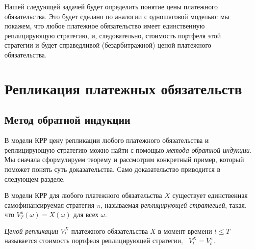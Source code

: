 Нашей следующей задачей будет определить понятие цены платежного обязательства.
Это будет сделано по аналогии с одношаговой моделью: мы покажем, что любое платежное обязательство имеет единственную реплицирующую стратегию, и, следовательно, стоимость портфеля этой стратегии и будет справедливой (безарбитражной) ценой платежного обязательства.


\section{Репликация платежных обязательств}
\subsection{Метод обратной индукции}

В модели КРР цену репликации любого платежного обязательства и реплицирующую стратегию можно найти с помощью \emph{метода обратной индукции}.
Мы сначала сформулируем теорему и рассмотрим конкретный пример, который поможет понять суть доказательства.
Само доказательство приводится в следующем разделе.

\begin{theorem}
В модели КРР для любого платежного обязательства $X$ существует единственная самофинансируемая стратегия $\pi$, называемая \emph{реплицирующей стратегией}, такая, что $V_T^\pi(\omega) = X(\omega)$ для всех $\omega$.
\end{theorem}

\begin{definition}
\emph{Ценой репликации} $V_t^X$ платежного обязательства $X$ в момент времени $t\le T$ называется стоимость портфеля реплицирующей стратегии, \te\ $V_t^X = V_t^\pi$.
\end{definition}

